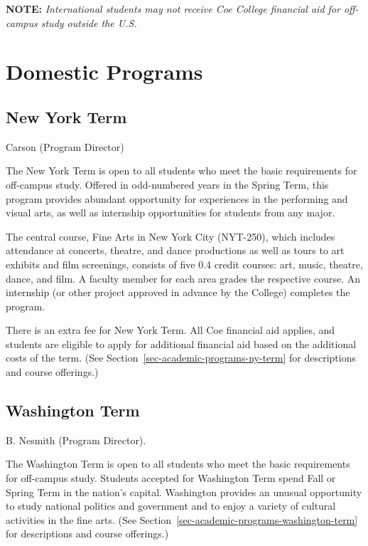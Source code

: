 \documentclass[
  letterpaper,
]{scrbook}
\begin{document}
\textbf{NOTE:} \emph{International students may not receive Coe College
financial aid for off-campus study outside the U.S.}

\section{Domestic Programs}\label{domestic-programs}

\subsection{New York Term}\label{new-york-term}

Carson (Program Director)

The New York Term is open to all students who meet the basic
requirements for off-campus study. Offered in odd-numbered years in the
Spring Term, this program provides abundant opportunity for experiences
in the performing and visual arts, as well as internship opportunities
for students from any major.

The central course, Fine Arts in New York City (NYT-250), which includes
attendance at concerts, theatre, and dance productions as well as tours
to art exhibits and film screenings, consists of five 0.4 credit
courses: art, music, theatre, dance, and film. A faculty member for each
area grades the respective course. An internship (or other project
approved in advance by the College) completes the program.

There is an extra fee for New York Term. All Coe financial aid applies,
and students are eligible to apply for additional financial aid based on
the additional costs of the term. (See
Section~\ref{sec-academic-programs-ny-term} for descriptions and course
offerings.)

\subsection{Washington Term}\label{washington-term}

B. Nesmith (Program Director).

The Washington Term is open to all students who meet the basic
requirements for off-campus study. Students accepted for Washington Term
spend Fall or Spring Term in the nation's capital. Washington provides
an unusual opportunity to study national politics and government and to
enjoy a variety of cultural activities in the fine arts. (See
Section~\ref{sec-academic-programs-washington-term} for descriptions and
course offerings.)
\end{document}
